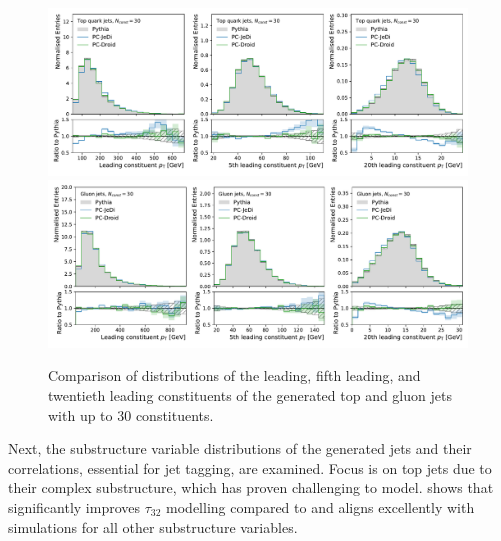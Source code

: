 \begin{figure}[htpb]
    \centering
    \includegraphics[width=0.99\textwidth]{Figures/jet_generation/droid/30/csts/t/100/t_leading_constituents.pdf} \\
    \includegraphics[width=0.99\textwidth]{Figures/jet_generation/droid/30/csts/g/100/g_leading_constituents.pdf}
    \caption{Comparison of \pt distributions of the leading, fifth leading, and twentieth leading constituents of the generated top and gluon jets with up to 30 constituents.}
    \label{fig:const-pt_dist-30}
\end{figure}

Next, the substructure variable distributions of the generated jets and their correlations, essential for jet tagging, are examined.
Focus is on top jets due to their complex substructure, which has proven challenging to model.
 shows that \pcdroid significantly improves $\tau_{32}$ modelling compared to \pcjedi and aligns excellently with \pythia simulations for all other substructure variables.

